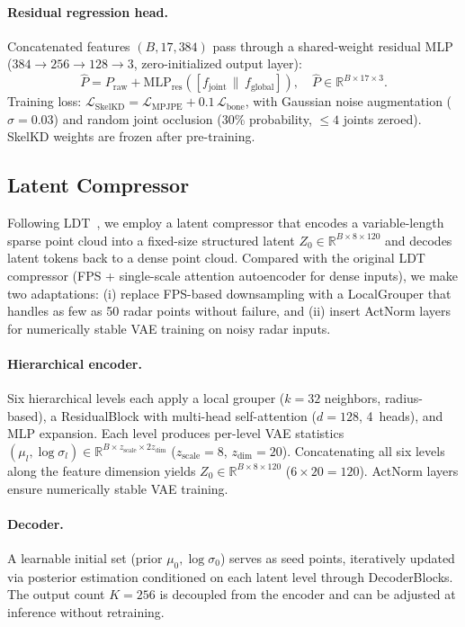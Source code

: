 \documentclass{article}
\newcommand{\Rbb}{\mathbb{R}}
\begin{document}
\paragraph{Residual regression head.}
Concatenated features $(B,17,384)$ pass through a shared-weight residual MLP
($384\!\to\!256\!\to\!128\!\to\!3$, zero-initialized output layer):
\begin{equation}
  \hat{P} = P_\text{raw}
            + \mathrm{MLP}_\text{res}\!\left([f_\text{joint}\,\|\,f_\text{global}]\right),
  \quad \hat{P}\!\in\!\Rbb^{B\times17\times3}.
\end{equation}
Training loss:
$\mathcal{L}_\text{SkelKD} = \mathcal{L}_\text{MPJPE} + 0.1\,\mathcal{L}_\text{bone}$,
with Gaussian noise augmentation ($\sigma\!=\!0.03$) and random joint occlusion
(30\% probability, $\leq\!4$ joints zeroed).
SkelKD weights are frozen after pre-training.

\subsection{Latent Compressor}
\label{sec:compressor}

Following LDT~\cite{ldt}, we employ a latent compressor that encodes a
variable-length sparse point cloud into a fixed-size structured latent
$Z_0\!\in\!\Rbb^{B\times8\times120}$ and decodes latent tokens back to a dense
point cloud.
Compared with the original LDT compressor (FPS + single-scale attention
autoencoder for dense inputs), we make two adaptations: (i) replace
FPS-based downsampling with a LocalGrouper that handles as few as 50 radar
points without failure, and (ii) insert ActNorm layers for numerically stable
VAE training on noisy radar inputs.

\paragraph{Hierarchical encoder.}
Six hierarchical levels each apply a local grouper ($k\!=\!32$ neighbors,
radius-based), a ResidualBlock with multi-head self-attention
($d\!=\!128$, 4~heads), and MLP expansion.
Each level produces per-level VAE statistics
$(\mu_l,\log\sigma_l)\!\in\!\Rbb^{B\times z_\text{scale}\times2z_\text{dim}}$
($z_\text{scale}\!=\!8$, $z_\text{dim}\!=\!20$).
Concatenating all six levels along the feature dimension yields
$Z_0\!\in\!\Rbb^{B\times8\times120}$ ($6\!\times\!20\!=\!120$).
ActNorm layers ensure numerically stable VAE training.

\paragraph{Decoder.}
A learnable initial set (prior $\mu_0, \log\sigma_0$) serves as seed points,
iteratively updated via posterior estimation conditioned on each latent level
through DecoderBlocks.
The output count $K\!=\!256$ is decoupled from the encoder and can be adjusted
at inference without retraining.
\end{document}
